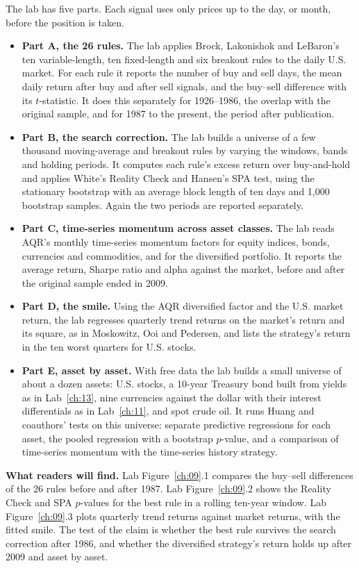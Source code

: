 The lab has five parts. Each signal uses only prices up to the day, or month, before the position is taken.

\begin{itemize}
  \item \textbf{Part A, the 26 rules.} The lab applies Brock, Lakonishok and LeBaron's ten variable-length, ten fixed-length and six breakout rules to the daily U.S. market. For each rule it reports the number of buy and sell days, the mean daily return after buy and after sell signals, and the buy--sell difference with its $t$-statistic. It does this separately for 1926--1986, the overlap with the original sample, and for 1987 to the present, the period after publication.
  \item \textbf{Part B, the search correction.} The lab builds a universe of a few thousand moving-average and breakout rules by varying the windows, bands and holding periods. It computes each rule's excess return over buy-and-hold and applies White's Reality Check and Hansen's SPA test, using the stationary bootstrap with an average block length of ten days and 1,000 bootstrap samples. Again the two periods are reported separately.
  \item \textbf{Part C, time-series momentum across asset classes.} The lab reads AQR's monthly time-series momentum factors for equity indices, bonds, currencies and commodities, and for the diversified portfolio. It reports the average return, Sharpe ratio and alpha against the market, before and after the original sample ended in 2009.
  \item \textbf{Part D, the smile.} Using the AQR diversified factor and the U.S. market return, the lab regresses quarterly trend returns on the market's return and its square, as in Moskowitz, Ooi and Pedersen, and lists the strategy's return in the ten worst quarters for U.S. stocks.
  \item \textbf{Part E, asset by asset.} With free data the lab builds a small universe of about a dozen assets: U.S. stocks, a 10-year Treasury bond built from yields as in Lab~\ref{ch:13}, nine currencies against the dollar with their interest differentials as in Lab~\ref{ch:11}, and spot crude oil. It runs Huang and coauthors' tests on this universe: separate predictive regressions for each asset, the pooled regression with a bootstrap $p$-value, and a comparison of time-series momentum with the time-series history strategy.
\end{itemize}

\textbf{What readers will find.} Lab Figure~\ref{ch:09}.1 compares the buy--sell differences of the 26 rules before and after 1987. Lab Figure~\ref{ch:09}.2 shows the Reality Check and SPA $p$-values for the best rule in a rolling ten-year window. Lab Figure~\ref{ch:09}.3 plots quarterly trend returns against market returns, with the fitted smile. The test of the claim is whether the best rule survives the search correction after 1986, and whether the diversified strategy's return holds up after 2009 and asset by asset.

